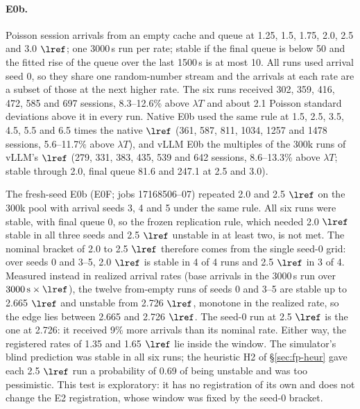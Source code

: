 \paragraph{E0b.} Poisson session arrivals from an empty cache and queue at 1.25, 1.5, 1.75, 2.0, 2.5 and 3.0 $\lref$; one 3000\,s run per rate; stable if the final queue is below 50 and the fitted rise of the queue over the last 1500\,s is at most 10. All runs used arrival seed 0, so they share one random-number stream and the arrivals at each rate are a subset of those at the next higher rate. The six runs received 302, 359, 416, 472, 585 and 697 sessions, 8.3--12.6\% above $\lambda T$ and about 2.1 Poisson standard deviations above it in every run. Native E0b used the same rule at 1.5, 2.5, 3.5, 4.5, 5.5 and 6.5 times the native $\lref$ (361, 587, 811, 1034, 1257 and 1478 sessions, 5.6--11.7\% above $\lambda T$), and vLLM E0b the multiples of the 300k runs of vLLM's $\lref$ (279, 331, 383, 435, 539 and 642 sessions, 8.6--13.3\% above $\lambda T$; stable through 2.0, final queue 81.6 and 247.1 at 2.5 and 3.0).

The fresh-seed E0b (E0F; jobs 17168506--07) repeated 2.0 and 2.5 $\lref$ on the 300k pool with arrival seeds 3, 4 and 5 under the same rule. All six runs were stable, with final queue 0, so the frozen replication rule, which needed 2.0 $\lref$ stable in all three seeds and 2.5 $\lref$ unstable in at least two, is not met. The nominal bracket of 2.0 to 2.5 $\lref$ therefore comes from the single seed-0 grid: over seeds 0 and 3--5, 2.0 $\lref$ is stable in 4 of 4 runs and 2.5 $\lref$ in 3 of 4. Measured instead in realized arrival rates (base arrivals in the 3000\,s run over $3000\,\mathrm{s}\times\lref$), the twelve from-empty runs of seeds 0 and 3--5 are stable up to 2.665 $\lref$ and unstable from 2.726 $\lref$, monotone in the realized rate, so the edge lies between 2.665 and 2.726 $\lref$. The seed-0 run at 2.5 $\lref$ is the one at 2.726: it received 9\% more arrivals than its nominal rate. Either way, the registered rates of 1.35 and 1.65 $\lref$ lie inside the window. The simulator's blind prediction was stable in all six runs; the heuristic H2 of \S\ref{sec:fp-heur} gave each 2.5 $\lref$ run a probability of 0.69 of being unstable and was too pessimistic. This test is exploratory: it has no registration of its own and does not change the E2 registration, whose window was fixed by the seed-0 bracket.

